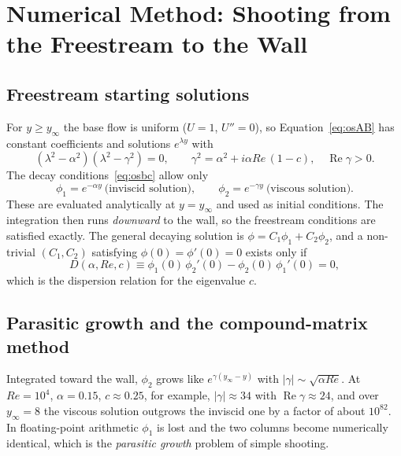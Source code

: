 \documentclass[12pt,a4paper]{article}
\begin{document}
\section{Numerical Method: Shooting from the Freestream to the Wall}
\label{sec:method}

\subsection{Freestream starting solutions}

For $y \ge y_\infty$ the base flow is uniform ($U = 1$, $U'' = 0$), so Equation~\eqref{eq:osAB} has constant coefficients and solutions $e^{\lambda y}$ with
\begin{equation}
    (\lambda^2 - \alpha^2)(\lambda^2 - \gamma^2) = 0, \qquad \gamma^2 = \alpha^2 + i\alpha Re\,(1 - c), \quad \operatorname{Re}\gamma > 0 .
\end{equation}
The decay conditions~\eqref{eq:osbc} allow only
\begin{equation}
    \phi_1 = e^{-\alpha y}\ \text{(inviscid solution)}, \qquad \phi_2 = e^{-\gamma y}\ \text{(viscous solution)}.
\end{equation}
These are evaluated analytically at $y = y_\infty$ and used as initial conditions. The integration then runs \emph{downward} to the wall, so the freestream conditions are satisfied exactly. The general decaying solution is $\phi = C_1\phi_1 + C_2\phi_2$, and a non-trivial $(C_1, C_2)$ satisfying $\phi(0) = \phi'(0) = 0$ exists only if
\begin{equation}
    D(\alpha, Re, c) \equiv \phi_1(0)\,\phi_2'(0) - \phi_2(0)\,\phi_1'(0) = 0 ,
    \label{eq:disp}
\end{equation}
which is the dispersion relation for the eigenvalue $c$.

\subsection{Parasitic growth and the compound-matrix method}

Integrated toward the wall, $\phi_2$ grows like $e^{\gamma(y_\infty - y)}$ with $|\gamma| \sim \sqrt{\alpha Re}$. At $Re = 10^4$, $\alpha = 0.15$, $c \approx 0.25$, for example, $|\gamma| \approx 34$ with $\operatorname{Re}\gamma \approx 24$, and over $y_\infty = 8$ the viscous solution outgrows the inviscid one by a factor of about $10^{82}$. In floating-point arithmetic $\phi_1$ is lost and the two columns become numerically identical, which is the \emph{parasitic growth} problem of simple shooting.
\end{document}
